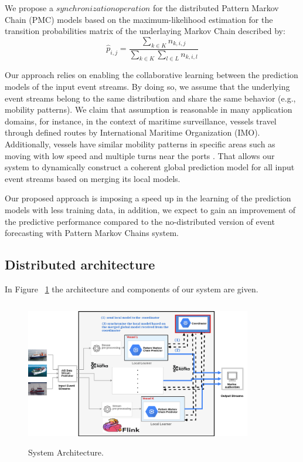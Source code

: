\par We propose a $synchronization operation$  for the distributed Pattern Markov Chain (PMC) models based on the maximum-likelihood estimation \citep{anderson1957statistical} for the transition probabilities matrix of the underlaying Markov Chain described by: 
\begin{equation}
\label{eq:pi_estim}
\hat{p}_{i,j}=\frac{\sum_{k \in K} n_{k,i,j}}{\sum_{k \in K} \sum_{l \in L} n_{k,i,l}}
\end{equation}


\par Our approach relies on enabling the collaborative learning between the prediction models of  the input event streams. By doing so, we assume that the underlying event streams belong to the same  distribution and share the same behavior (e.g., mobility patterns). We claim that assumption is reasonable in many application domains, for instance, in the context of maritime surveillance, vessels travel through defined routes by International Maritime Organization (IMO). Additionally, vessels have similar mobility patterns in specific areas such as moving with low speed and multiple turns near the ports \cite{pallotta2013vessel,liu2014knowledge}. That allows our system to dynamically construct a coherent global prediction model for all input event streams based on merging its local models.

\par Our proposed approach is imposing a speed up in the learning of the prediction models with less training data, in addition, we expect to gain an improvement of the predictive performance compared to the no-distributed  version of event forecasting with Pattern Markov Chains system. 


\subsection{Distributed architecture}
In Figure ~\ref{fig:architecture} the architecture and components of our  system are given.

\begin{figure}[h]

\includegraphics[height=2.5in, width=3.9in]{figures/distributed_architecture.png}
	
\caption{System Architecture.}
\label{fig:architecture}
\end{figure}
